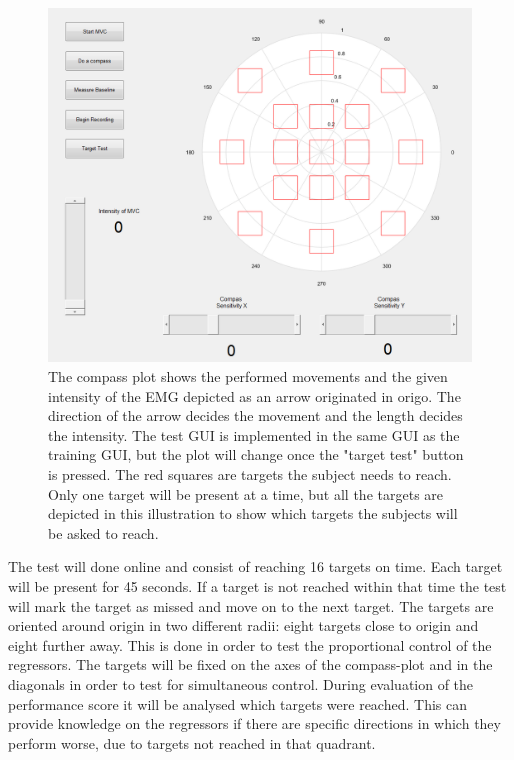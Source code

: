 \begin{figure}[H]
	\includegraphics[width=1\textwidth]{figures/Methods/PlacesToGo.png}  %
	\caption{The compass plot shows the performed movements and the given intensity of the EMG depicted as an arrow originated in origo. The direction of the arrow decides the movement and the length decides the intensity. The test GUI is implemented in the same GUI as the training GUI, but the plot will change once the "target test" button is pressed. The red squares are targets the subject needs to reach. Only one target will be present at a time, but all the targets are depicted in this illustration to show which targets the subjects will be asked to reach.}
	\label{fig:PlacesToGo}
\end{figure}

The test will done online and consist of reaching 16 targets on time. Each target will be present for 45 seconds. If a target is not reached within that time the test will mark the target as missed and move on to the next target. The targets are oriented around origin in two different radii: eight targets close to origin and eight further away. This is done in order to test the proportional control of the regressors. The targets will be fixed on the axes of the compass-plot and in the diagonals in order to test for simultaneous control. 
During evaluation of the performance score it will be analysed which targets were reached. This can provide knowledge on the regressors if there are specific directions in which they perform worse, due to targets not reached in that quadrant. 


%
%
%
